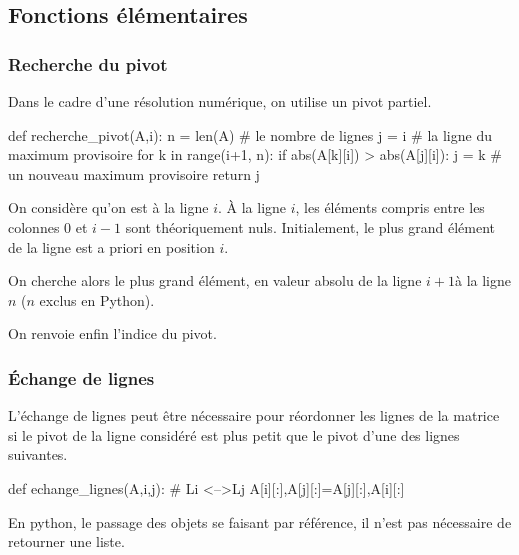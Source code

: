 \documentclass[10pt]{article}
\begin{document}
\subsection{Fonctions élémentaires}
\subsubsection{Recherche du pivot}
Dans le cadre d'une résolution numérique, on utilise un pivot partiel. 

\begin{py}
\begin{python}
def recherche_pivot(A,i):
    n = len(A) # le nombre de lignes
    j = i # la ligne du maximum provisoire
    for k in range(i+1, n):
        if abs(A[k][i]) > abs(A[j][i]):
            j = k # un nouveau maximum provisoire
    return j
\end{python}
\end{py}


On considère qu'on est à la ligne $i$. \`A la ligne $i$, les éléments compris entre les colonnes 0 et $i-1$ sont théoriquement nuls. Initialement, le plus grand élément de la ligne est a priori en position $i$. 

On cherche alors le plus grand élément, en valeur absolu de la ligne $i+1$à la ligne $n$ ($n$ exclus en Python). 

On renvoie enfin l'indice du pivot. 

\subsubsection{Échange de lignes}

L'échange de lignes peut être nécessaire pour réordonner les lignes de la matrice si le pivot de la ligne considéré est plus petit que le pivot d'une des lignes suivantes.  

\begin{py}
\begin{python}
def echange_lignes(A,i,j):
    # Li <-->Lj
    A[i][:],A[j][:]=A[j][:],A[i][:]
\end{python}
\end{py}

\begin{rem}
En python, le passage des objets se faisant par référence, il n'est pas nécessaire de retourner une liste. 
\end{rem}
\end{document}
